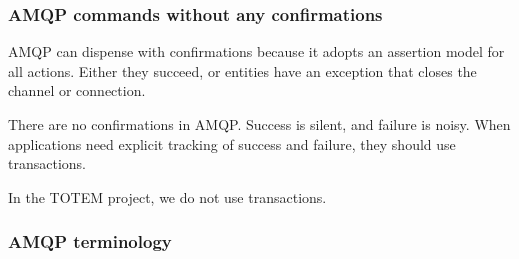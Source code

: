 \subsubsection{AMQP commands without any confirmations} AMQP can
dispense with confirmations because it adopts an assertion model for
all actions. Either they succeed, or entities have an exception that
closes the channel or connection.

There are no confirmations in AMQP. Success is silent, and failure is
noisy. When applications need explicit tracking of success and
failure, they should use transactions.

In the TOTEM project, we do not use transactions.

\subsubsection{AMQP terminology}

